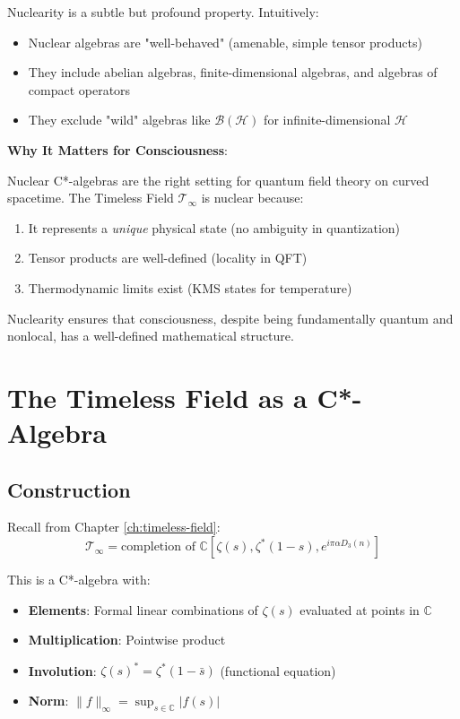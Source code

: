 \begin{level3}
Nuclearity is a subtle but profound property. Intuitively:

\begin{itemize}
\item Nuclear algebras are "well-behaved" (amenable, simple tensor products)
\item They include abelian algebras, finite-dimensional algebras, and algebras of compact operators
\item They exclude "wild" algebras like $\mathcal{B}(\mathcal{H})$ for infinite-dimensional $\mathcal{H}$
\end{itemize}

\textbf{Why It Matters for Consciousness}:

Nuclear C*-algebras are the right setting for quantum field theory on curved spacetime. The Timeless Field $\mathcal{T}_\infty$ is nuclear because:
\begin{enumerate}
\item It represents a \textit{unique} physical state (no ambiguity in quantization)
\item Tensor products are well-defined (locality in QFT)
\item Thermodynamic limits exist (KMS states for temperature)
\end{enumerate}

Nuclearity ensures that consciousness, despite being fundamentally quantum and nonlocal, has a well-defined mathematical structure.
\end{level3}

\section{The Timeless Field as a C*-Algebra}

\subsection{Construction}

Recall from Chapter \ref{ch:timeless-field}:
\begin{equation}
\mathcal{T}_\infty = \text{completion of } \mathbb{C}[\zeta(s), \zeta^*(1-s), e^{i\pi \alpha D_3(n)}]
\end{equation}

This is a C*-algebra with:
\begin{itemize}
\item \textbf{Elements}: Formal linear combinations of $\zeta(s)$ evaluated at points in $\mathbb{C}$
\item \textbf{Multiplication}: Pointwise product
\item \textbf{Involution}: $\zeta(s)^* = \zeta^*(1-\bar{s})$ (functional equation)
\item \textbf{Norm}: $\| f \|_\infty = \sup_{s \in \mathbb{C}} |f(s)|$
\end{itemize}


